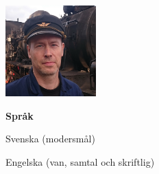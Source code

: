 \documentclass[a4paper,swedish,11pt]{article}
\begin{document}
\begin{minipage}[t]{0.24\textwidth}%
    \raggedleft%
    \vspace{-\topskip+1cm}
    \includegraphics[height=3.5cm]{bild.jpg}

    \textbf{Språk}
    \begin{description}[nosep,itemsep=0.1ex]
      \raggedleft\small%
    \item Svenska (modersmål)
    \item Engelska (van, samtal och skriftlig)
    \end{description}
\end{minipage}
\end{document}
